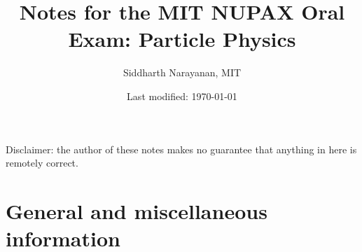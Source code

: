 

\pagestyle{fancy}
\chead{\today}
\setcounter{section}{-1}


\title{Notes for the MIT NUPAX Oral Exam: Particle Physics}
\date{Last modified: \today}
\author{Siddharth Narayanan, MIT}

\maketitle

\vspace{20mm}
\centering
Disclaimer: the author of these notes makes no guarantee that anything in here is remotely correct. 

\clearpage
\tableofcontents
\clearpage

\section{General and miscellaneous information}
